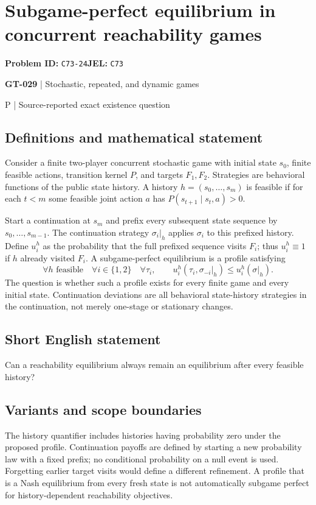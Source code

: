 \documentclass[11pt,a4paper]{article}
\begin{document}
\section*{Subgame-perfect equilibrium in concurrent reachability games}
\textbf{Problem ID:} \texttt{C73-24}\quad \textbf{JEL:} \texttt{C73}\par
\label{problem:OP-0159}
\label{game:GT-029}
{\sffamily\small\color{muted}
{\sffamily\small\color{muted}\textbf{GT-029} | Stochastic, repeated, and dynamic games\par P | Source-reported exact existence question\par}
\par}
\subsection*{Definitions and mathematical statement}
Consider a finite two-player concurrent stochastic game with initial state $s_0$, finite feasible actions, transition kernel $P$, and targets $F_1,F_2$. Strategies are behavioral functions of the public state history. A history $h=(s_0,\ldots,s_m)$ is feasible if for each $t<m$ some feasible joint action $a$ has $P(s_{t+1}\mid s_t,a)>0$.

Start a continuation at $s_m$ and prefix every subsequent state sequence by $s_0,\ldots,s_{m-1}$. The continuation strategy $\sigma_i|_h$ applies $\sigma_i$ to this prefixed history. Define $u_i^h$ as the probability that the full prefixed sequence visits $F_i$; thus $u_i^h\equiv1$ if $h$ already visited $F_i$. A subgame-perfect equilibrium is a profile satisfying
\[
 \forall h\text{ feasible}\quad\forall i\in\{1,2\}\quad\forall\tau_i,
 \qquad
 u_i^h(\tau_i,\sigma_{-i}|_h)\leq u_i^h(\sigma|_h).
\]
The question is whether such a profile exists for every finite game and every initial state. Continuation deviations are all behavioral state-history strategies in the continuation, not merely one-stage or stationary changes.
\subsection*{Short English statement}
Can a reachability equilibrium always remain an equilibrium after every feasible history?
\subsection*{Variants and scope boundaries}
The history quantifier includes histories having probability zero under the proposed profile. Continuation payoffs are defined by starting a new probability law with a fixed prefix; no conditional probability on a null event is used. Forgetting earlier target visits would define a different refinement. A profile that is a Nash equilibrium from every fresh state is not automatically subgame perfect for history-dependent reachability objectives.
\end{document}
